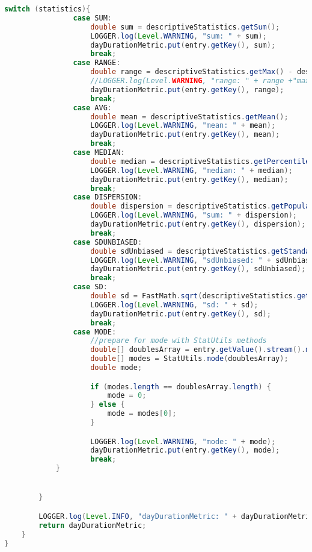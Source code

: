 \begin{lstlisting}[language=Java]
            switch (statistics){
                case SUM:
                    double sum = descriptiveStatistics.getSum();
                    LOGGER.log(Level.WARNING, "sum: " + sum);
                    dayDurationMetric.put(entry.getKey(), sum);
                    break;
                case RANGE:
                    double range = descriptiveStatistics.getMax() - descriptiveStatistics.getMin();
                    //LOGGER.log(Level.WARNING, "range: " + range +"max"+ descriptiveStatistics.getMax() + "min" +descriptiveStatistics.getMin());
                    dayDurationMetric.put(entry.getKey(), range);
                    break;
                case AVG:
                    double mean = descriptiveStatistics.getMean();
                    LOGGER.log(Level.WARNING, "mean: " + mean);
                    dayDurationMetric.put(entry.getKey(), mean);
                    break;
                case MEDIAN:
                    double median = descriptiveStatistics.getPercentile(50);
                    LOGGER.log(Level.WARNING, "median: " + median);
                    dayDurationMetric.put(entry.getKey(), median);
                    break;
                case DISPERSION:
                    double dispersion = descriptiveStatistics.getPopulationVariance();
                    LOGGER.log(Level.WARNING, "sum: " + dispersion);
                    dayDurationMetric.put(entry.getKey(), dispersion);
                    break;
                case SDUNBIASED:
                    double sdUnbiased = descriptiveStatistics.getStandardDeviation();
                    LOGGER.log(Level.WARNING, "sdUnbiased: " + sdUnbiased);
                    dayDurationMetric.put(entry.getKey(), sdUnbiased);
                    break;
                case SD:
                    double sd = FastMath.sqrt(descriptiveStatistics.getPopulationVariance());
                    LOGGER.log(Level.WARNING, "sd: " + sd);
                    dayDurationMetric.put(entry.getKey(), sd);
                    break;
                case MODE:
                    //prepare for mode with StatUtils methods
                    double[] doublesArray = entry.getValue().stream().mapToDouble(d -> d).toArray();
                    double[] modes = StatUtils.mode(doublesArray);
                    double mode;

                    if (modes.length == doublesArray.length) {
                        mode = 0;
                    } else {
                        mode = modes[0];
                    }

                    LOGGER.log(Level.WARNING, "mode: " + mode);
                    dayDurationMetric.put(entry.getKey(), mode);
                    break;
            }


        }

        LOGGER.log(Level.INFO, "dayDurationMetric: " + dayDurationMetric);
        return dayDurationMetric;
    }
}






\end{lstlisting}

